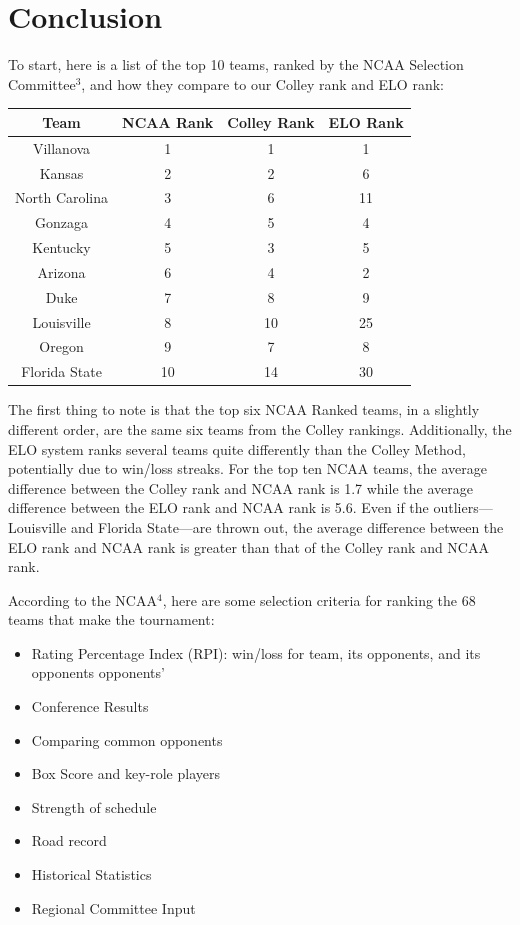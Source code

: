 \documentclass{article}
\begin{document}
\section{Conclusion}
To start, here is a list of the top 10 teams, ranked by the NCAA Selection Committee$^{3}$, and how they compare to our Colley rank and ELO rank:
\begin{center}
\begin{tabular}{|c|c|c|c|}
\hline
Team & NCAA Rank & Colley Rank & ELO Rank \\
\hline
\hline
Villanova& 1 & 1 & 1\\ \hline
Kansas& 2 & 2 & 6\\ \hline
North Carolina & 3 & 6 & 11 \\ \hline
Gonzaga& 4 & 5 & 4\\ \hline
Kentucky& 5 & 3 & 5\\ \hline
Arizona& 6 & 4 & 2\\ \hline
Duke& 7 & 8 & 9\\ \hline
Louisville& 8 & 10 & 25\\ \hline
Oregon& 9 & 7 & 8\\ \hline
Florida State& 10 & 14 & 30\\ \hline
\end{tabular}
\end{center}
The first thing to note is that the top six NCAA Ranked teams, in a slightly different order, are the same six teams from the Colley rankings. Additionally, the ELO system ranks several teams quite differently than the Colley Method, potentially due to win/loss streaks. For the top ten NCAA teams, the average difference between the Colley rank and NCAA rank is 1.7 while the average difference between the ELO rank and NCAA rank is 5.6. Even if the outliers---Louisville and Florida State---are thrown out, the average difference between the ELO rank and NCAA rank is greater than that of the Colley rank and NCAA rank.

According to the NCAA$^{4}$, here are some selection criteria for ranking the 68 teams that make the tournament:
\begin{itemize}
\item Rating Percentage Index (RPI): win/loss for team, its opponents, and its opponents opponents'
\item Conference Results
\item Comparing common opponents
\item Box Score and key-role players
\item Strength of schedule
\item Road record
\item Historical Statistics
\item Regional Committee Input
\end{itemize}
\end{document}

